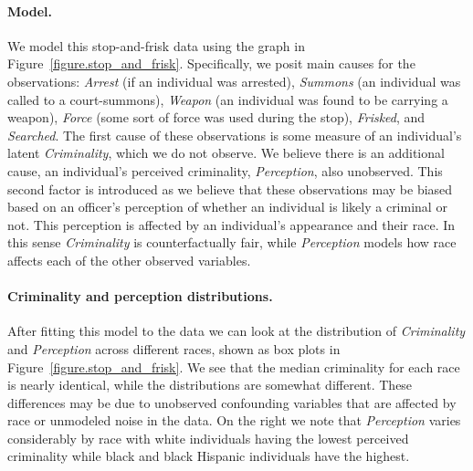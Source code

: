 \paragraph{Model.}
We model this stop-and-frisk data using the graph in Figure~\ref{figure.stop_and_frisk}. Specifically, we posit main causes for the observations: \emph{Arrest} (if an individual was arrested), \emph{Summons} (an individual was called to a court-summons), \emph{Weapon} (an individual was found to be carrying a weapon), \emph{Force} (some sort of force was used during the stop), \emph{Frisked}, and \emph{Searched}. The first cause of these observations is some measure of an individual's latent \emph{Criminality}, which we do not observe. We believe there is an additional cause, an individual's perceived criminality, \emph{Perception}, also unobserved. This second factor is introduced as we believe that these observations may be biased based on an officer's perception of whether an individual is likely a criminal or not. This perception is affected by an individual's appearance and their race. In this sense \emph{Criminality} is counterfactually fair, while \emph{Perception} models how race affects each of the other observed variables.

\paragraph{Criminality and perception distributions.}
After fitting this model to the data we can look at the distribution of \emph{Criminality} and \emph{Perception} across different races, shown as box plots in Figure~\ref{figure.stop_and_frisk}. We see that the median criminality for each race is nearly identical, while the distributions are somewhat different. These differences may be due to unobserved confounding variables that are affected by race or unmodeled noise in the data. On the right we note that \emph{Perception} varies considerably by race with white individuals having the lowest perceived criminality while black and black Hispanic individuals have the highest.

